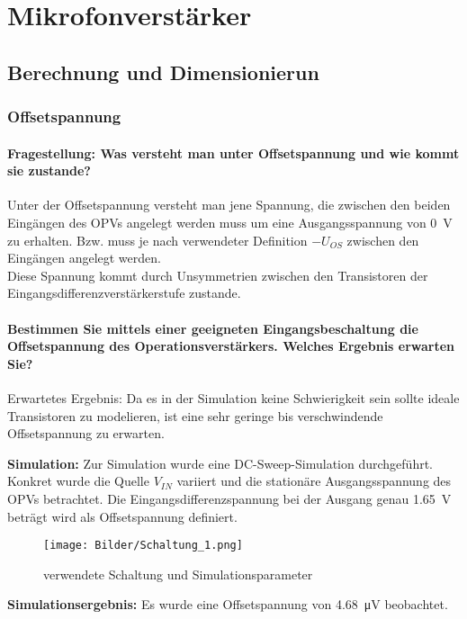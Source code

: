\chapter{Mikrofonverstärker}
\section{Berechnung und Dimensionierun}
\subsection{Offsetspannung}
\subsubsection{Fragestellung: Was versteht man unter Offsetspannung und wie kommt sie zustande?}

Unter der Offsetspannung versteht man jene Spannung, die zwischen den beiden Eingängen des OPVs angelegt werden muss um eine Ausgangsspannung von \SI{0}{\volt} zu erhalten. Bzw. muss je nach verwendeter Definition $-U_{OS}$ zwischen den Eingängen angelegt werden.\\

Diese Spannung kommt durch Unsymmetrien zwischen den Transistoren der Eingangsdifferenzverstärkerstufe zustande.

\subsubsection{Bestimmen Sie mittels einer geeigneten Eingangsbeschaltung die Offsetspannung des Operationsverstärkers. Welches Ergebnis erwarten Sie?}

Erwartetes Ergebnis: Da es in der Simulation keine Schwierigkeit sein sollte ideale Transistoren zu modelieren, ist eine sehr geringe bis verschwindende Offsetspannung zu erwarten.

\textbf{Simulation:}
Zur Simulation wurde eine DC-Sweep-Simulation durchgeführt. Konkret wurde die Quelle $V_{IN}$ variiert und die stationäre Ausgangsspannung des OPVs betrachtet. Die Eingangsdifferenzspannung bei der Ausgang genau \SI{1.65}{\volt} beträgt wird als Offsetspannung definiert.
\begin{figure}[H]
    \centering
    \texttt{[image: Bilder/Schaltung\_1.png]}
    \caption{verwendete Schaltung und Simulationsparameter}
    \label{fig:my_label}
\end{figure}

\textbf{Simulationsergebnis:} Es wurde eine Offsetspannung von \SI{4.68}{\micro \volt} beobachtet.

